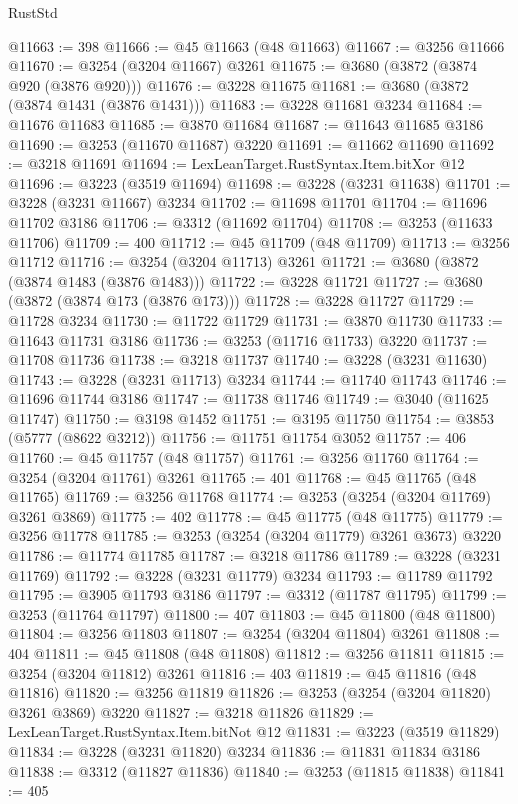 \begin{lexlean}{RustStd}
\begin{coremodule}
@11663 := 398
@11666 := @45 @11663 (@48 @11663)
@11667 := @3256 @11666
@11670 := @3254 (@3204 @11667) @3261
@11675 := @3680 (@3872 (@3874 @920 (@3876 @920)))
@11676 := @3228 @11675
@11681 := @3680 (@3872 (@3874 @1431 (@3876 @1431)))
@11683 := @3228 @11681 @3234
@11684 := @11676 @11683
@11685 := @3870 @11684
@11687 := @11643 @11685 @3186
@11690 := @3253 (@11670 @11687) @3220
@11691 := @11662 @11690
@11692 := @3218 @11691
@11694 := LexLeanTarget.RustSyntax.Item.bitXor @12
@11696 := @3223 (@3519 @11694)
@11698 := @3228 (@3231 @11638)
@11701 := @3228 (@3231 @11667) @3234
@11702 := @11698 @11701
@11704 := @11696 @11702 @3186
@11706 := @3312 (@11692 @11704)
@11708 := @3253 (@11633 @11706)
@11709 := 400
@11712 := @45 @11709 (@48 @11709)
@11713 := @3256 @11712
@11716 := @3254 (@3204 @11713) @3261
@11721 := @3680 (@3872 (@3874 @1483 (@3876 @1483)))
@11722 := @3228 @11721
@11727 := @3680 (@3872 (@3874 @173 (@3876 @173)))
@11728 := @3228 @11727
@11729 := @11728 @3234
@11730 := @11722 @11729
@11731 := @3870 @11730
@11733 := @11643 @11731 @3186
@11736 := @3253 (@11716 @11733) @3220
@11737 := @11708 @11736
@11738 := @3218 @11737
@11740 := @3228 (@3231 @11630)
@11743 := @3228 (@3231 @11713) @3234
@11744 := @11740 @11743
@11746 := @11696 @11744 @3186
@11747 := @11738 @11746
@11749 := @3040 (@11625 @11747)
@11750 := @3198 @1452
@11751 := @3195 @11750
@11754 := @3853 (@5777 (@8622 @3212))
@11756 := @11751 @11754 @3052
@11757 := 406
@11760 := @45 @11757 (@48 @11757)
@11761 := @3256 @11760
@11764 := @3254 (@3204 @11761) @3261
@11765 := 401
@11768 := @45 @11765 (@48 @11765)
@11769 := @3256 @11768
@11774 := @3253 (@3254 (@3204 @11769) @3261 @3869)
@11775 := 402
@11778 := @45 @11775 (@48 @11775)
@11779 := @3256 @11778
@11785 := @3253 (@3254 (@3204 @11779) @3261 @3673) @3220
@11786 := @11774 @11785
@11787 := @3218 @11786
@11789 := @3228 (@3231 @11769)
@11792 := @3228 (@3231 @11779) @3234
@11793 := @11789 @11792
@11795 := @3905 @11793 @3186
@11797 := @3312 (@11787 @11795)
@11799 := @3253 (@11764 @11797)
@11800 := 407
@11803 := @45 @11800 (@48 @11800)
@11804 := @3256 @11803
@11807 := @3254 (@3204 @11804) @3261
@11808 := 404
@11811 := @45 @11808 (@48 @11808)
@11812 := @3256 @11811
@11815 := @3254 (@3204 @11812) @3261
@11816 := 403
@11819 := @45 @11816 (@48 @11816)
@11820 := @3256 @11819
@11826 := @3253 (@3254 (@3204 @11820) @3261 @3869) @3220
@11827 := @3218 @11826
@11829 := LexLeanTarget.RustSyntax.Item.bitNot @12
@11831 := @3223 (@3519 @11829)
@11834 := @3228 (@3231 @11820) @3234
@11836 := @11831 @11834 @3186
@11838 := @3312 (@11827 @11836)
@11840 := @3253 (@11815 @11838)
@11841 := 405

\end{coremodule}
\end{lexlean}
